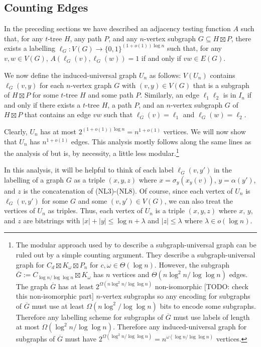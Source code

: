 \documentclass{patmorin}
\begin{document}
\subsection{Counting Edges}

In the preceding sections we have described an adjacency testing function $A$ such that, for any $t$-tree $H$, any path $P$, and any $n$-vertex subgraph $G\subseteq H\boxtimes P$, there exists a labelling $\ell_G:V(G)\to\{0,1\}^{(1+o(1))\log n}$ such that, for any $v,w\in V(G)$, $A(\ell_G(v),\ell_G(w))=1$ if and only if $vw\in E(G)$.

We now define the induced-universal graph $U_n$ as follows: $V(U_n)$ contains $\ell_G(v,y)$ for each $n$-vertex graph $G$ with $(v,y)\in V(G)$ that is a subgraph of $H\boxtimes P$ for some $t$-tree $H$ and some path $P$.  Similarly, an edge $\ell_1\ell_2$ is in $I_n$ if and only if there exists a $t$-tree $H$, a path $P$, and an $n$-vertex subgraph $G$ of $H\boxtimes P$ that contains an edge $vw$ such that $\ell_G(v)=\ell_1$ and $\ell_G(w)=\ell_2$.

Clearly, $U_n$ has at most $2^{(1+o(1))\log n}=n^{1+o(1)}$ vertices.  We will now show that $U_n$ has $n^{1+o(1)}$ edges.  This analysis mostly follows along the same lines as the analysis of \citet{esperet.joret.ea:sparse} but is, by necessity, a little less modular.\footnote{The modular approach used by \citet{esperet.joret.ea:sparse} to describe a subgraph-universal graph can be ruled out by a simple counting argument.  They describe a subgraph-universal graph for $C_d\boxtimes K_\omega\boxtimes P_n$ for $c,\omega\in\Theta(\log n)$.  However, the subgraph $\overline{G}:=C_{\log n/\log\log n}\boxtimes K_\omega$ has $n$ vertices and $\Theta(n\log^2 n/\log\log n)$ edges.  The graph $\overline{G}$ has at least $2^{\Omega(n\log^2 n/\log\log n)}$ non-isomorphic [TODO: check this non-isomorphic part] $n$-vertex subgraphs so any encoding for subgraphs of $\overline{G}$ must use at least $\Omega(n\log^2/\log\log n)$ bits to encode some subgraphs.  Therefore any labelling scheme for subgraphs of $\overline{G}$ must use labels of length at most $\Omega(\log^2 n/\log\log n)$.  Therefore any induced-universal graph for subgraphs of $\overline{G}$ must have $2^{\Omega(\log^2 n/\log\log n)}=n^{\omega(\log n/\log\log n)}$ vertices.}

In this analysis, it will be helpful to think of each label $\ell_G(v,y')$ in the labelling of a graph $G$ as a triple $(x,y,z)$ where $x=\sigma_y(x_y(v))$, $y=\alpha(y')$, and $z$ is the concatenation of (NL3)-(NL8). Of course, since each vertex of $U_n$ is $\ell_G(v,y')$ for some $G$ and some $(v,y')\in V(G)$, we can also treat the vertices of $U_n$ as triples.  Thus, each vertex of $U_n$ is a triple $(x,y,z)$ where $x$, $y$, and $z$ are bitstrings with  $|x|+|y|\le \log n + \lambda$ and $|z|\le \lambda$ where $\lambda\in o(\log n)$.
\end{document}

